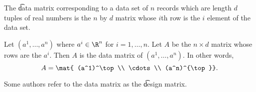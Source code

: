 


The \t{data matrix} corresponding to a data set of $n$ records which are length $d$ tuples of real numbers is the $n$ by $d$ matrix whose $i$th row is the $i$ element of the data set.


Let $(a^1, \dots, a^n)$ where $a^i \in \R^n$ for $i = 1, \dots, n$.
Let $A$ be the $n \times d$ matrix whose rows are the $a^i$.  Then $A$ is the data matrix of $(a^1, \dots, a^n)$.
In other words,
\[
  A = \mat{ (a^1)^\top \\ \cdots \\ (a^n)^{\top}}.
\]



Some authors refer to the data matrix as the \t{design matrix}.
